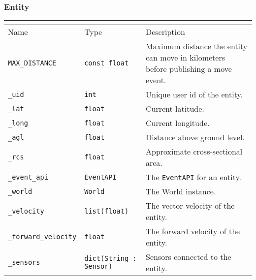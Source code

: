 \documentclass[titlepage]{article}
\newcommand{\attributes}[1]{
    \begin{center}
        \begin{tabular}{|p{3.5cm}|p{3.5cm}|p{7cm}|}
            \multicolumn{3}{|l|}{\cellcolor[gray]{0.5}{\textbf{Attributes}}} \\ \hline
            \rowcolor[gray]{0.8} Name & Type & Description \\ \hline 
            #1
        \end{tabular}
    \end{center}
}
\newcommand{\attribute}[3]{
    \texttt{#1} & \texttt{#2} & #3 \\ \hline
}
\begin{document}
\subsubsection{Entity}
\attributes{
    \attribute{MAX\_DISTANCE}{const float}{Maximum distance the entity can move in kilometers before publishing a move event.}
    \attribute{\_uid}{int}{Unique user id of the entity.}
    \attribute{\_lat}{float}{Current latitude.}
    \attribute{\_long}{float}{Current longitude.}
    \attribute{\_agl}{float}{Distance above ground level.}
    \attribute{\_rcs}{float}{Approximate cross-sectional area.}
    \attribute{\_event\_api}{EventAPI}{The \texttt{EventAPI} for an entity.}
    \attribute{\_world}{World}{The World instance.}
    \attribute{\_velocity}{\texttt{list(float)}}{The vector velocity of the entity.}
    \attribute{\_forward\_velocity}{float}{The forward velocity of the entity.}
    \attribute{\_sensors}{dict(String : Sensor)}{Sensors connected to the entity.}
}
\end{document}
